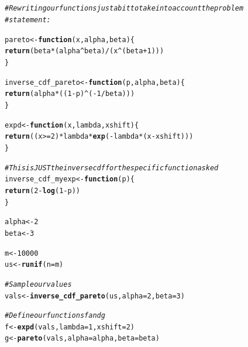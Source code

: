 \documentclass{article}\usepackage[]{graphicx}\usepackage[]{color}
\makeatletter
\newcommand{\hlnum}[1]{\textcolor[rgb]{0.686,0.059,0.569}{#1}}%
\newcommand{\hlcom}[1]{\textcolor[rgb]{0.678,0.584,0.686}{\textit{#1}}}%
\newcommand{\hlopt}[1]{\textcolor[rgb]{0,0,0}{#1}}%
\newcommand{\hlstd}[1]{\textcolor[rgb]{0.345,0.345,0.345}{#1}}%
\newcommand{\hlkwa}[1]{\textcolor[rgb]{0.161,0.373,0.58}{\textbf{#1}}}%
\newcommand{\hlkwb}[1]{\textcolor[rgb]{0.69,0.353,0.396}{#1}}%
\newcommand{\hlkwc}[1]{\textcolor[rgb]{0.333,0.667,0.333}{#1}}%
\newcommand{\hlkwd}[1]{\textcolor[rgb]{0.737,0.353,0.396}{\textbf{#1}}}%
\newenvironment{kframe}{%
 \def\at@end@of@kframe{}%
 \ifinner\ifhmode%
  \def\at@end@of@kframe{\end{minipage}}%
  \begin{minipage}{\columnwidth}%
 \fi\fi%
 \def\FrameCommand##1{\hskip\@totalleftmargin \hskip-\fboxsep
 \colorbox{shadecolor}{##1}\hskip-\fboxsep
     \hskip-\linewidth \hskip-\@totalleftmargin \hskip\columnwidth}%
 \MakeFramed {\advance\hsize-\width
   \@totalleftmargin\z@ \linewidth\hsize
   \@setminipage}}%
 {\par\unskip\endMakeFramed%
 \at@end@of@kframe}
\newenvironment{knitrout}{}{} %
\makeatother
\begin{document}
\subsection{}

\begin{knitrout}
\color{fgcolor}\begin{kframe}
\begin{alltt}
\hlcom{# Rewriting our functions just a bit to take into account the problem}
\hlcom{# statement:}

\hlstd{pareto} \hlkwb{<-} \hlkwa{function}\hlstd{(}\hlkwc{x}\hlstd{,} \hlkwc{alpha}\hlstd{,} \hlkwc{beta}\hlstd{) \{}
  \hlkwd{return}\hlstd{(beta} \hlopt{*} \hlstd{(alpha}\hlopt{^}\hlstd{beta)} \hlopt{/} \hlstd{(x}\hlopt{^}\hlstd{(beta}\hlopt{+}\hlnum{1}\hlstd{)))}
\hlstd{\}}

\hlstd{inverse_cdf_pareto} \hlkwb{<-} \hlkwa{function}\hlstd{(}\hlkwc{p}\hlstd{,} \hlkwc{alpha}\hlstd{,} \hlkwc{beta}\hlstd{) \{}
  \hlkwd{return}\hlstd{( alpha} \hlopt{*} \hlstd{((}\hlnum{1} \hlopt{-} \hlstd{p)} \hlopt{^} \hlstd{(}\hlopt{-}\hlnum{1} \hlopt{/} \hlstd{beta)) )}
\hlstd{\}}

\hlstd{expd} \hlkwb{<-} \hlkwa{function}\hlstd{(}\hlkwc{x}\hlstd{,} \hlkwc{lambda}\hlstd{,} \hlkwc{xshift}\hlstd{) \{}
  \hlkwd{return}\hlstd{( (x} \hlopt{>=} \hlnum{2}\hlstd{)} \hlopt{*} \hlstd{lambda} \hlopt{*} \hlkwd{exp}\hlstd{(} \hlopt{-}\hlstd{lambda} \hlopt{*} \hlstd{(x} \hlopt{-} \hlstd{xshift) ))}
\hlstd{\}}

\hlcom{# This is JUST the inverse cdf for the specific function asked}
\hlstd{inverse_cdf_myexp} \hlkwb{<-} \hlkwa{function}\hlstd{(}\hlkwc{p}\hlstd{) \{}
  \hlkwd{return}\hlstd{(}\hlnum{2} \hlopt{-} \hlkwd{log}\hlstd{(}\hlnum{1}\hlopt{-}\hlstd{p))}
\hlstd{\}}

\hlstd{alpha} \hlkwb{<-} \hlnum{2}
\hlstd{beta} \hlkwb{<-} \hlnum{3}

\hlstd{m} \hlkwb{<-} \hlnum{10000}
\hlstd{us} \hlkwb{<-} \hlkwd{runif}\hlstd{(}\hlkwc{n}\hlstd{=m)}

\hlcom{# Sample our values}
\hlstd{vals} \hlkwb{<-} \hlkwd{inverse_cdf_pareto}\hlstd{(us,} \hlkwc{alpha}\hlstd{=}\hlnum{2}\hlstd{,} \hlkwc{beta}\hlstd{=}\hlnum{3}\hlstd{)}

\hlcom{# Define our functions f and g}
\hlstd{f} \hlkwb{<-} \hlkwd{expd}\hlstd{(vals,} \hlkwc{lambda} \hlstd{=} \hlnum{1}\hlstd{,} \hlkwc{xshift}\hlstd{=}\hlnum{2}\hlstd{)}
\hlstd{g} \hlkwb{<-} \hlkwd{pareto}\hlstd{(vals,} \hlkwc{alpha}\hlstd{=alpha,} \hlkwc{beta}\hlstd{=beta)}


\end{alltt}
\end{kframe}
\end{knitrout}
\end{document}
